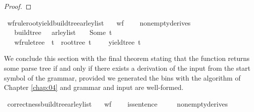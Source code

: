\begin{isabellebody}
\begin{isamarkuptext}
\begin{proof}
\end{proof}%
\end{isamarkuptext}\isamarkuptrue%
\isamarkupfalse%
\ wf{\isacharunderscore}{\kern0pt}rule{\isacharunderscore}{\kern0pt}root{\isacharunderscore}{\kern0pt}yield{\isacharunderscore}{\kern0pt}build{\isacharunderscore}{\kern0pt}tree{\isacharunderscore}{\kern0pt}{\isasymE}arley{\isacharunderscore}{\kern0pt}list{\isacharcolon}{\kern0pt}\isanewline
\ \ \ {\isachardoublequoteopen}wf{\isacharunderscore}{\kern0pt}{\isasymG}\ {\isasymG}{\isachardoublequoteclose}\isanewline
\ \ \ {\isachardoublequoteopen}nonempty{\isacharunderscore}{\kern0pt}derives\ {\isasymG}{\isachardoublequoteclose}\isanewline
\ \ \ {\isachardoublequoteopen}build{\isacharunderscore}{\kern0pt}tree\ {\isasymG}\ {\isasymomega}\ {\isacharparenleft}{\kern0pt}{\isasymE}arley{\isacharunderscore}{\kern0pt}list\ {\isasymG}\ {\isasymomega}{\isacharparenright}{\kern0pt}\ {\isacharequal}{\kern0pt}\ Some\ t{\isachardoublequoteclose}\isanewline
\ \ \ {\isachardoublequoteopen}wf{\isacharunderscore}{\kern0pt}rule{\isacharunderscore}{\kern0pt}tree\ {\isasymG}\ t\ {\isasymand}\ root{\isacharunderscore}{\kern0pt}tree\ t\ {\isacharequal}{\kern0pt}\ {\isasymSS}\ {\isasymG}\ {\isasymand}\ yield{\isacharunderscore}{\kern0pt}tree\ t\ {\isacharequal}{\kern0pt}\ {\isasymomega}{\isachardoublequoteclose}%
\isadelimproof
%
\endisadelimproof
%
\isatagproof
%
\endisatagproof
{\isafoldproof}%
%
\isadelimproof
%
\endisadelimproof
%
\begin{isamarkuptext}%
We conclude this section with the final theorem stating that the function 
returns some parse tree if and only if there exists a derivation of the input from the start symbol
of the grammar, provided we generated the bins with the algorithm of Chapter \ref{chap:04} and grammar
and input are well-formed.%
\end{isamarkuptext}\isamarkuptrue%
\isamarkupfalse%
\ correctness{\isacharunderscore}{\kern0pt}build{\isacharunderscore}{\kern0pt}tree{\isacharunderscore}{\kern0pt}{\isasymE}arley{\isacharunderscore}{\kern0pt}list{\isacharcolon}{\kern0pt}\isanewline
\ \ \ {\isachardoublequoteopen}wf{\isacharunderscore}{\kern0pt}{\isasymG}\ {\isasymG}{\isachardoublequoteclose}\isanewline
\ \ \ {\isachardoublequoteopen}is{\isacharunderscore}{\kern0pt}sentence\ {\isasymG}\ {\isasymomega}{\isachardoublequoteclose}\isanewline
\ \ \ {\isachardoublequoteopen}nonempty{\isacharunderscore}{\kern0pt}derives\ {\isasymG}{\isachardoublequoteclose}\isanewline

\end{isabellebody}
